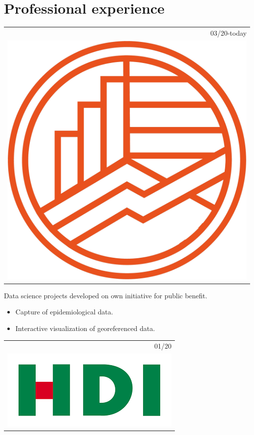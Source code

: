 \documentclass[]{friggeri-cv}
\begin{document}
\section{Professional experience}
\vspace{-0.4cm}
\begin{entrylist}
\entry
   {   \begin{tabular}{r}
    		\hspace{0.85cm}03/20-today\\
     		\includegraphics[scale=0.04]{img/Logo_Solo_Figura_Color.png}
	\end{tabular}
    }
    {\vspace{-1.17cm}}
    { }
    {Data science projects developed on own initiative for public benefit.
    \begin{itemize}
    	\item Capture of epidemiological data.
	\item Interactive visualization of georeferenced data.
\end{itemize}}
\entry
   {   \begin{tabular}{r}
    		01/20\\
     		\hspace{0.87cm}\includegraphics[scale=0.15]{img/hdi.png}

\end{tabular}}
\end{entrylist}
\end{document}
